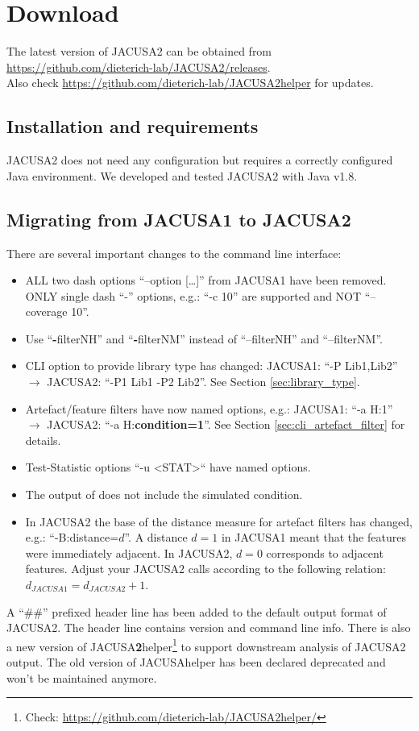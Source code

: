 \documentclass[10pt,a4paper,final]{article}
\begin{document}
\section{Download}
The latest version of JACUSA2 can be obtained from \url{https://github.com/dieterich-lab/JACUSA2/releases}. \\
Also check \url{https://github.com/dieterich-lab/JACUSA2helper} for updates.
\subsection{Installation and requirements}
JACUSA2 does not need any configuration but requires a correctly configured Java environment.
We developed and tested JACUSA2 with Java v1.8.
\subsection{Migrating from JACUSA1 to JACUSA2}\label{sec:migration}
There are several important changes to the command line interface:
\begin{itemize}
  \item ALL two dash options ``--option [\ldots]'' from JACUSA1 have been removed. ONLY single dash 
  ``-'' options, e.g.: ``-c 10'' are supported and NOT ``--coverage 10''.
  \item Use ``\textbf{-}filterNH'' and ``\textbf{-}filterNM'' instead of ``--filterNH'' and
  ``--filterNM''.
  \item CLI option to provide library type has changed: JACUSA1: ``-P Lib1,Lib2'' $\rightarrow$
  JACUSA2: ``-P1 Lib1 -P2 Lib2''. See Section \ref{sec:library_type}.
  \item Artefact/feature filters have now named options, e.g.: JACUSA1: ``-a H:1'' $\rightarrow$
  JACUSA2: ``-a H:\textbf{condition=1}''. See Section \ref{sec:cli_artefact_filter} for details.
  \item Test-Statistic options ``-u <STAT>`` have named options.
  \item The output of  does not include the simulated condition.
  \item In JACUSA2 the base of the distance measure for artefact filters has changed, e.g.: ``-B:distance=$d$''.
   A distance $d=1$ in JACUSA1 meant that the features were immediately adjacent. In JACUSA2, 
   $d=0$ corresponds to adjacent features. Adjust your JACUSA2 calls according to the following 
   relation: $d_{JACUSA1} = d_{JACUSA2} +1 $.
\end{itemize}
A ``\#\#'' prefixed header line has been added to the default output format of JACUSA2. The header
line contains version and command line info.
There is also a new version of JACUSA\textbf{2}helper\footnote{Check: 
\url{https://github.com/dieterich-lab/JACUSA2helper/}} to support downstream
analysis of JACUSA2 output. The old version of JACUSAhelper has been declared deprecated and won't be maintained
anymore.
\end{document}
